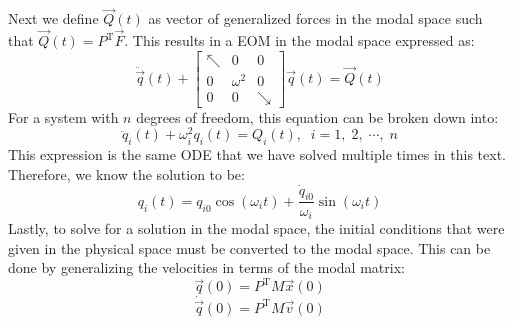 \documentclass[12pt,letter]{article}
\begin{document}
	Next we define $\vec{Q}(t)$ as vector of generalized forces in the modal space such that $\vec{Q}(t) = P^{\text{T}}\vec{F}$. This results in a EOM in the modal space expressed as:
	\begin{equation}
	\ddot{\vec{q}}(t) +  \begin{bmatrix} \nwarrow & 0 & 0 \\  0  & \omega^2 & 0 \\  0  & 0 & \searrow \end{bmatrix} \vec{q}(t) = \vec{Q}(t)
	\end{equation}
	For a system with $n$ degrees of freedom, this equation can be broken down into:
	\begin{equation}
	\ddot{q}_i(t) + \omega_i^2 q_i (t) =  Q_i(t), \; \; i=1, \; 2, \; \cdots, \;n
	\end{equation}
	This expression is the same ODE that we have solved multiple times in this text. Therefore, we know the solution to be:
	\begin{equation}
	q_i(t) = q_{i0} \cos(\omega_i t) +  \frac{\dot{q}_{i0}}{\omega_i} \sin( \omega_i t)
	\end{equation}
	Lastly, to solve for a solution in the modal space, the initial conditions that were given in the physical space must be converted to the modal space. This can be done by generalizing the velocities in terms of the modal matrix:
	\begin{equation}
	\vec{q}(0) = P^\text{T} M \vec{x}(0)
	\end{equation}
	\begin{equation}
	\dot{\vec{q}}(0) = P^\text{T} M \vec{v}(0)
	\end{equation}
	
	
	
\end{document}
